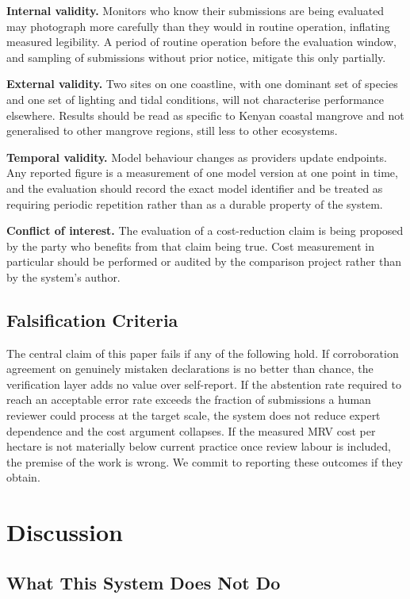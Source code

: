\documentclass[10pt,twocolumn,a4paper]{article}
\begin{document}
\textbf{Internal validity.} Monitors who know their submissions are being
evaluated may photograph more carefully than they would in routine operation,
inflating measured legibility. A period of routine operation before the
evaluation window, and sampling of submissions without prior notice, mitigate
this only partially.

\textbf{External validity.} Two sites on one coastline, with one dominant set of
species and one set of lighting and tidal conditions, will not characterise
performance elsewhere. Results should be read as specific to Kenyan coastal
mangrove and not generalised to other mangrove regions, still less to other
ecosystems.

\textbf{Temporal validity.} Model behaviour changes as providers update
endpoints. Any reported figure is a measurement of one model version at one
point in time, and the evaluation should record the exact model identifier and
be treated as requiring periodic repetition rather than as a durable property of
the system.

\textbf{Conflict of interest.} The evaluation of a cost-reduction claim is being
proposed by the party who benefits from that claim being true. Cost measurement
in particular should be performed or audited by the comparison project rather
than by the system's author.

\subsection{Falsification Criteria}

The central claim of this paper fails if any of the following hold. If
corroboration agreement on genuinely mistaken declarations is no better than
chance, the verification layer adds no value over self-report. If the abstention
rate required to reach an acceptable error rate exceeds the fraction of
submissions a human reviewer could process at the target scale, the system does
not reduce expert dependence and the cost argument collapses. If the measured
MRV cost per hectare is not materially below current practice once review labour
is included, the premise of the work is wrong. We commit to reporting these
outcomes if they obtain.

\section{Discussion}

\subsection{What This System Does Not Do}
\end{document}
